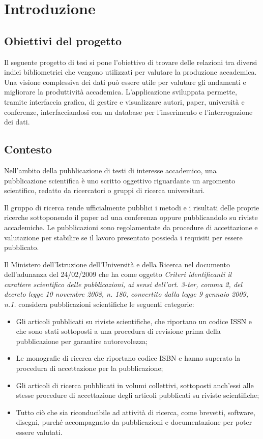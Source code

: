 \chapter{Introduzione}

\section{Obiettivi del progetto}
Il seguente progetto di tesi si pone l’obiettivo di trovare delle relazioni tra diversi indici bibliometrici che vengono utilizzati 
per valutare la produzione accademica. 
Una visione complessiva dei dati può essere utile per valutare gli andamenti e migliorare la produttività accademica. 
L’applicazione sviluppata permette, tramite interfaccia grafica, di gestire e visualizzare autori, paper, università e conferenze, 
interfacciandosi con un database per l’inserimento e l’interrogazione dei dati. 



\section{Contesto}
Nell’ambito della pubblicazione di testi di interesse accademico, una pubblicazione scientifica è uno scritto oggettivo riguardante 
un argomento scientifico, redatto da ricercatori o gruppi di ricerca universitari. 

Il gruppo di ricerca rende ufficialmente pubblici i metodi e i risultati delle proprie ricerche sottoponendo il paper ad una 
conferenza oppure pubblicandolo su riviste accademiche. Le pubblicazioni sono regolamentate da procedure di accettazione e valutazione 
per stabilire se il lavoro presentato possieda i requisiti per essere pubblicato.

Il Ministero dell’Istruzione dell’Università e della Ricerca nel documento dell’adunanza del 24/02/2009 che ha come oggetto 
\textit{Criteri identificanti il carattere scientifico delle pubblicazioni, ai sensi dell’art. 3-ter, comma 2, del decreto legge 10 
novembre 2008, n. 180, convertito dalla legge 9 gennaio 2009, n.1.}  considera pubblicazioni scientifiche le seguenti categorie:

\begin{itemize}
    \item Gli articoli pubblicati su riviste scientifiche, che riportano un codice ISSN e che sono stati 
    sottoposti a una procedura di revisione prima della pubblicazione per garantire autorevolezza;
    \item Le monografie di ricerca che riportano codice ISBN e hanno superato la procedura di 
    accettazione per la pubblicazione; 
    \item Gli articoli di ricerca pubblicati in volumi collettivi, sottoposti anch'essi alle stesse procedure di 
    accettazione degli articoli pubblicati su riviste scientifiche;
    \item Tutto ciò che sia riconducibile ad attività di ricerca, come brevetti, software, disegni, 
    purché accompagnato da pubblicazioni e documentazione per poter essere valutati.
\end{itemize}

